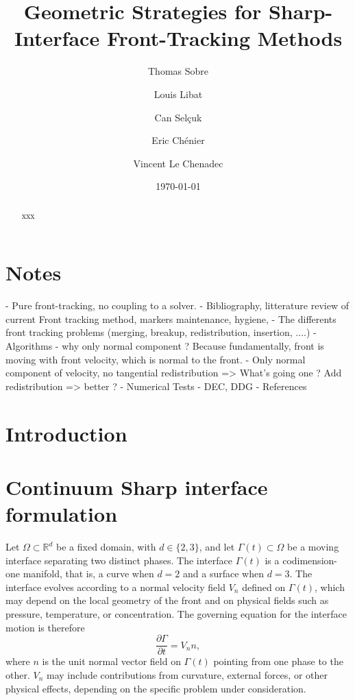 \documentclass{article}
\title{Geometric Strategies for Sharp-Interface Front-Tracking Methods}
\author[1]{Thomas Sobre}
\author[1]{Louis Libat \correspondingauthor}
\author[1]{Can Selçuk}
\author[1]{Eric Chénier}
\author[1]{Vincent Le Chenadec}
\affil[1]{MSME, Université Gustave Eiffel, UMR CNRS 8208, Marne-la-Vallée, 77454, France}
\date{\today}
\begin{document}
\maketitle

\begin{abstract}
    xxx
\end{abstract}

\section{Notes}
- Pure front-tracking, no coupling to a solver. 
- Bibliography, litterature review of current Front tracking method, markers maintenance, hygiene,
- The differents front tracking problems (merging, breakup, redistribution, insertion, ....)
- Algorithms
- why only normal component ? Because fundamentally, front is moving with front velocity, which is normal to the front. 
- Only normal component of velocity, no tangential redistribution => What's going one ? Add redistribution => better ?
- Numerical Tests
- DEC, DDG
- References

\section{Introduction}

\cite{koffi_bi_accuracy_2022}

\section{Continuum Sharp interface formulation}
\label{sec:governing}

Let $\Omega\subset\mathbb{R}^d$ be a fixed domain, with $d\in\{2,3\}$, and let $\Gamma(t)\subset\Omega$ be a moving interface separating two distinct phases.
The interface $\Gamma(t)$ is a codimension-one manifold, that is, a curve when $d=2$ and a surface when $d=3$.
The interface evolves according to a normal velocity field $V_n$ defined on $\Gamma(t)$, which may depend on the local geometry of the front and on physical fields such as pressure, temperature, or concentration.
The governing equation for the interface motion is therefore
\begin{equation}
\frac{\partial \Gamma}{\partial t} = V_n n, 
\label{eq:interface_motion}
\end{equation}
where $n$ is the unit normal vector field on $\Gamma(t)$ pointing from one phase to the other.
$V_n$ may include contributions from curvature, external forces, or other physical effects, depending on the specific problem under consideration. 
\end{document}
